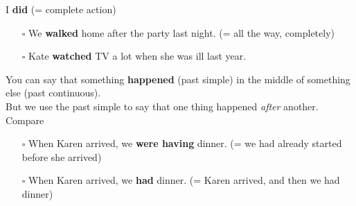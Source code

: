 I \textbf{did} (= complete action)
\begin{itemize}
    \item[$\square$] We \textbf{walked} home after the party last night. (= all the way, completely)
    \item[$\square$] Kate \textbf{watched} TV a lot when she was ill last year.
\end{itemize}
You can say that something \textbf{happened} (past simple) in the middle of something else (past continuous). \\
But we use the past simple to say that one thing happened \textit{after} another. \\
Compare
\begin{itemize}
    \item[$\square$] When Karen arrived, we \textbf{were having} dinner. (= we had already started before she arrived)
    \item[$\square$] When Karen arrived, we \textbf{had} dinner. (= Karen arrived, and then we had dinner)
\end{itemize}

